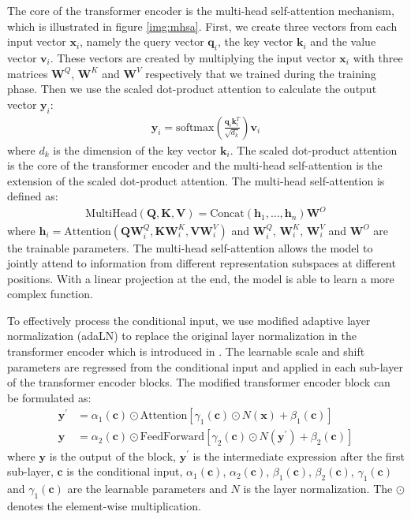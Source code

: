 \documentclass[12pt,DIV14,BCOR12mm,a4paper,footinclude=false,headinclude,parskip=half-,twoside,openright,cleardoublepage=empty,toc=index,bibliography=totoc,listof=totoc]{scrreprt}
\numberwithin{equation}{chapter}
\begin{document}
The core of the transformer encoder is the multi-head self-attention mechanism, which is illustrated in figure \ref{img:mhsa}. First, we create three vectors from each input vector $\mathbf{x}_{i}$, namely the query vector $\mathbf{q}_{i}$, the key vector $\mathbf{k}_{i}$ and the value vector $\mathbf{v}_{i}$. These vectors are created by multiplying the input vector $\mathbf{x}_{i}$ with three matrices $\mathbf{W}^{Q}$, $\mathbf{W}^{K}$ and $\mathbf{W}^{V}$ respectively that we trained during the training phase. Then we use the scaled dot-product attention to calculate the output vector $\mathbf{y}_{i}$:
\begin{align}
  \mathbf{y}_{i} = \text{softmax}\left(\frac{\mathbf{q}_{i}\mathbf{k}_{i}^{T}}{\sqrt{d_{k}}}\right)\mathbf{v}_{i}
\end{align}
where $d_{k}$ is the dimension of the key vector $\mathbf{k}_{i}$. The scaled dot-product attention is the core of the transformer encoder and the multi-head self-attention is the extension of the scaled dot-product attention. The multi-head self-attention is defined as:
\begin{align}
  \text{MultiHead}(\mathbf{Q}, \mathbf{K}, \mathbf{V}) = \text{Concat}(\mathbf{h}_{1},...,\mathbf{h}_{n})\mathbf{W}^{O}
\end{align}
where $\mathbf{h}_{i} = \text{Attention}(\mathbf{Q}\mathbf{W}_{i}^{Q}, \mathbf{K}\mathbf{W}_{i}^{K}, \mathbf{V}\mathbf{W}_{i}^{V})$ and $\mathbf{W}_{i}^{Q}$, $\mathbf{W}_{i}^{K}$, $\mathbf{W}_{i}^{V}$ and $\mathbf{W}^{O}$ are the trainable parameters. The multi-head self-attention allows the model to jointly attend to information from different representation subspaces at different positions. With a linear projection at the end, the model is able to learn a more complex function.

To effectively process the conditional input, we use modified adaptive layer normalization (adaLN) to replace the original layer normalization in the transformer encoder which is introduced in \cite{perez2017film,Peebles2022DiT}. The learnable scale and shift parameters are regressed from the conditional input and applied in each sub-layer of the transformer encoder blocks. The modified transformer encoder block can be formulated as:
\begin{align}
  \mathbf{y}^{'} &= \alpha_{1}(\mathbf{c})\odot {\text{Attention}[\gamma_{1}(\mathbf{c})\odot N(\mathbf{x}) + \beta_{1}(\mathbf{c})]}\\
  \mathbf{y} &= \alpha_{2}(\mathbf{c})\odot {\text{FeedForward}[\gamma_{2}(\mathbf{c})\odot N(\mathbf{y}^{'}) + \beta_{2}(\mathbf{c})]}
\end{align}
where $\mathbf{y}$ is the output of the block, $\mathbf{y}^{'}$ is the intermediate expression after the first sub-layer,  $\mathbf{c}$ is the conditional input, $\alpha_{1}(\mathbf{c})$, $\alpha_{2}(\mathbf{c})$, $\beta_{1}(\mathbf{c})$, $\beta_{2}(\mathbf{c})$, $\gamma_{1}(\mathbf{c})$ and $\gamma_{1}(\mathbf{c})$ are the learnable parameters and $N$ is the layer normalization. The $\odot$ denotes the element-wise multiplication.
\end{document}
